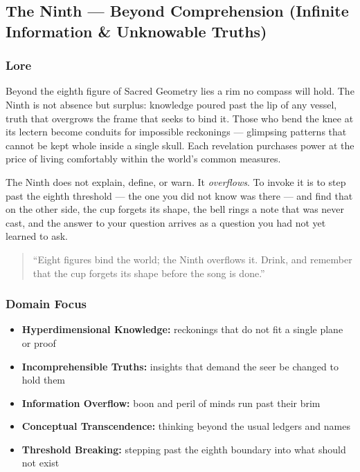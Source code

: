 
\subsection{The Ninth --- Beyond Comprehension (Infinite Information \& Unknowable Truths)}

\subsubsection*{Lore}
Beyond the eighth figure of Sacred Geometry lies a rim no compass will hold. The Ninth is not absence but surplus: knowledge poured past the lip of any vessel, truth that overgrows the frame that seeks to bind it. Those who bend the knee at its lectern become conduits for impossible reckonings --- glimpsing patterns that cannot be kept whole inside a single skull. Each revelation purchases power at the price of living comfortably within the world's common measures.

The Ninth does not explain, define, or warn. It \textit{overflows}. To invoke it is to step past the eighth threshold --- the one you did not know was there --- and find that on the other side, the cup forgets its shape, the bell rings a note that was never cast, and the answer to your question arrives as a question you had not yet learned to ask.

\begin{quote}
``Eight figures bind the world; the Ninth overflows it. Drink, and remember that the cup forgets its shape before the song is done.''
\end{quote}

\subsubsection*{Domain Focus}
\begin{itemize}
  \item \textbf{Hyperdimensional Knowledge:} reckonings that do not fit a single plane or proof
  \item \textbf{Incomprehensible Truths:} insights that demand the seer be changed to hold them
  \item \textbf{Information Overflow:} boon and peril of minds run past their brim
  \item \textbf{Conceptual Transcendence:} thinking beyond the usual ledgers and names
  \item \textbf{Threshold Breaking:} stepping past the eighth boundary into what should not exist
\end{itemize}

